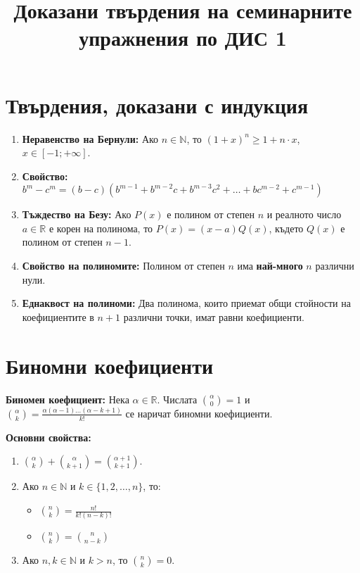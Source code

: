 \documentclass[11pt,oneside,a4paper]{article}
\begin{document}
\title{Доказани твърдения на семинарните упражнения по ДИС 1}
\date{}
\maketitle
\vspace{-4em} 

\section*{Твърдения, доказани с индукция}

\begin{enumerate}
    \item \textbf{Неравенство  на Бернули:}  
    Ако \(n \in \mathbb{N} \), то \((1 + x)^n \geq 1 + n \cdot x\), \(x \in [-1; +\infty]\).
    \item \textbf{Свойство:} 
    \(b^m - c^m = (b - c)(b^{m-1} + b^{m-2}c + b^{m-3}c^2 + \dots + bc^{m-2} + c^{m-1})\)
    \item \textbf{Тъждество на Безу:}  
    Ако \(P(x)\) е полином от степен \(n\) и реалното число \(a \in \mathbb{R}\) е корен на полинома, то \(P(x) = (x-a)Q(x)\), където \(Q(x)\) е полином от степен \(n-1\).
    \item \textbf{Свойство на полиномите:}  
    Полином от степен \(n\) има \textbf{най-много} \(n\) различни нули.
    \item \textbf{Еднаквост на полиноми:}  
    Два полинома, които приемат общи стойности на коефициентите в \(n+1\) различни точки, имат равни коефициенти.
\end{enumerate}

\section*{Биномни коефициенти}

\textbf{Биномен коефициент:}  
Нека \(\alpha \in \mathbb{R}\). Числата \(\binom{\alpha}{0} = 1\) и \(\binom{\alpha}{k} = \frac{\alpha(\alpha - 1)\dots(\alpha - k + 1)}{k!}\) се наричат биномни коефициенти.

\textbf{Основни свойства:} \vspace{-\baselineskip}
\begin{enumerate}[label=\textbf{(\alph*)}]
    \item \(\binom{\alpha}{k} + \binom{\alpha}{k+1} = \binom{\alpha + 1}{k + 1}\).
    \item Ако \(n \in \mathbb{N}\) и \(k \in \{1, 2, \dots, n\}\), то:
    \begin{itemize}
        \item \(\binom{n}{k} = \frac{n!}{k!(n-k)!}\)
        \item \(\binom{n}{k} = \binom{n}{n-k}\)
    \end{itemize}
    \item Ако \(n, k \in \mathbb{N}\) и \(k > n\), то \(\binom{n}{k} = 0\).
\end{enumerate}
\end{document}
